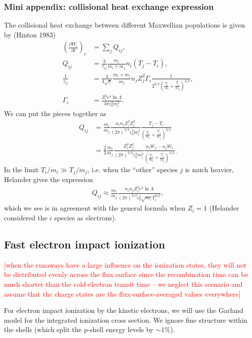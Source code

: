 \documentclass[11pt,a4paper]{article}
\begin{document}
\subsubsection*{Mini appendix: collisional heat exchange expression}
The collisional heat exchange between different Maxwellian populations is given by (Hinton 1983)
\begin{align}
\left(\frac{\partial W_i}{\partial t}\right)_c &= \sum_j Q_{ij}, \nonumber\\
Q_{ij} &= \frac{3}{\tau_{ij}}\frac{m_i}{m_i+m_j}n_i(T_j-T_i), \nonumber\\
\frac{1}{\tau_{ij}} &= \frac{4}{3\sqrt{\pi}}\frac{m_i+m_j}{m_j} n_j Z_j^2\Gamma_i \frac{1}{2^{3/2}\left(\frac{T_i}{m_i}+\frac{T_j}{m_j}\right)^{3/2}}, \nonumber\\
\Gamma_i &= \frac{Z_i^2 e^4 \ln\Lambda}{4\pi\varepsilon_0^2 m_i^2}.
\end{align}
We can put the pieces together as
\begin{align}
Q_{ij} &=\frac{m_i}{m_j} \frac{n_i n_j Z_i^2 Z_j^2}{(2\pi)^{3/2}\varepsilon_0^2 m_i^2}\frac{T_j-T_i}{\left(\frac{T_i}{m_i}+\frac{T_j}{m_j}\right)^{3/2}} \nonumber \\
&= \frac{2}{3}\frac{m_i}{m_j} \frac{Z_i^2 Z_j^2}{(2\pi)^{3/2}\varepsilon_0^2 m_i^2}\frac{n_iW_j-n_jW_i}{\left(\frac{T_i}{m_i}+\frac{T_j}{m_j}\right)^{3/2}}.
\end{align}
In the limit $T_i/m_i \gg T_j/m_j$, i.e. when the ``other'' species $j$ is much heavier, Helander gives the expression
\begin{align}
Q_{ij} \approx \frac{m_i}{m_j}\frac{n_in_j Z_j^2 e^4\ln\Lambda}{(2\pi)^{3/2}\varepsilon_0^2 \sqrt{m_i}T_i^{3/2}},
\end{align}
which we see is in agreement with the general formula when $Z_i=1$ (Helander considered the $i$ species as electrons). 

\subsection{Fast electron impact ionization}
\textcolor{red}{[when the runaways have a large influence on the ionization states, they will not be distributed evenly across the flux surface since the recombination time can be much shorter than the cold-electron transit time -- we neglect this scenario and assume that the charge states are the flux-surface-averaged values everywhere]}

For electron impact ionization by the kinetic electrons, we will use the Garland model for the integrated ionization cross section. We ignore fine structure within the shells (which split the p-shell energy levels by $\sim 1\%$).
\end{document}
